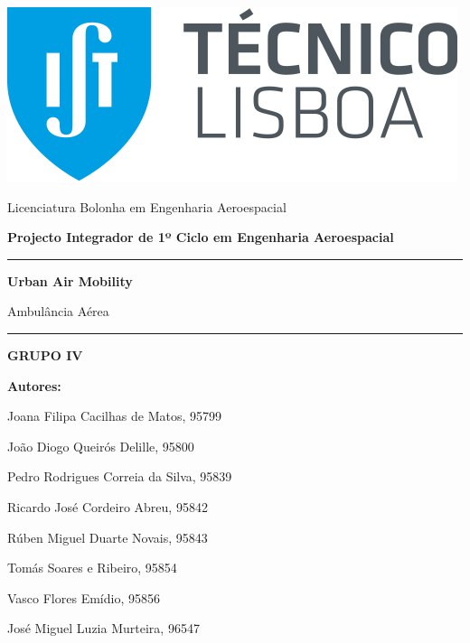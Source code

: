 \begin{titlepage}

   \begin{center}
        \includegraphics[scale=0.3]{Imagens/IST.png} 
        
        \vspace*{0.8cm}
        {\LARGE Licenciatura Bolonha em Engenharia Aeroespacial}
        
        \vspace{1.8cm} 
        \textbf{\LARGE Projecto Integrador de 1º Ciclo em Engenharia Aeroespacial}
        
        \vspace{1.8 cm}
        \noindent\rule{13cm}{0.4pt}
        
        \vspace{0.5cm}
        \textbf{\Huge Urban Air Mobility}

        \vspace{0.3cm}
       {\LARGE Ambulância Aérea}
       
        \noindent\rule{13cm}{0.4pt}
        
        \vspace{3cm}
        
        \large\textbf{GRUPO IV}
       \vspace{0.5cm}

       \large {\textbf{Autores:} 
       \par Joana Filipa Cacilhas de Matos, 95799
       \par João Diogo Queirós Delille, 95800
       \par Pedro Rodrigues Correia da Silva, 95839
       \par Ricardo José Cordeiro Abreu, 95842
       \par Rúben Miguel Duarte Novais, 95843
       \par Tomás Soares e Ribeiro, 95854
       \par Vasco Flores Emídio, 95856
       \par José Miguel Luzia Murteira, 96547}

            
   \end{center}
\end{titlepage}

\clearpage